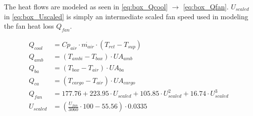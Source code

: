 
The heat flows are modeled as seen in \cref{eq:box_Qcool} $\rightarrow$ \cref{eq:box_Qfan}. $ U_{scaled} $ in \cref{eq:box_Uscaled} is simply an intermediate scaled fan speed used in modeling the fan heat loss $ Q_{fan} $.

\begin{align}
	Q_{cool}   & = Cp_{air} \cdot \dot{m_{air}} \cdot (T_{ret} - T_{sup})	\label{eq:box_Qcool}                                 \\
	Q_{amb}    & = (T_{ambi} - T_{box}) \cdot U A_{amb}						\label{eq:box_Qab}                                                \\
	Q_{ba}     & = (T_{box} - T_{air}) \cdot U A_{ba}						\label{eq:box_Qba}                                                  \\
	Q_{ca}     & = (T_{cargo} - T_{air}) \cdot U A_{cargo}                                                                     \\
	Q_{fan}    & = 177.76 + 223.95 \cdot U_{scaled} + 105.85 \cdot U_{scaled}^2 + 16.74 \cdot U_{scaled}^3 \label{eq:box_Qfan} \\
	U_{scaled} & = \left( \frac{U_{fan}}{3060}\cdot 100 - 55.56 \right) \cdot 0.0335 \label{eq:box_Uscaled}
\end{align}

